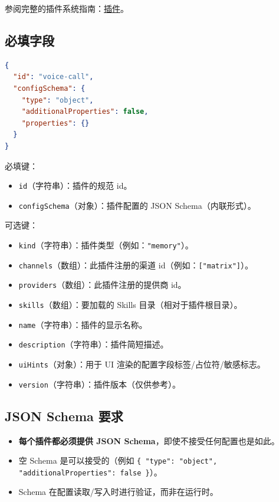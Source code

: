 参阅完整的插件系统指南：\href{/tools/plugin}{插件}。

\subsection{必填字段}


\begin{lstlisting}[language=json]
{
  "id": "voice-call",
  "configSchema": {
    "type": "object",
    "additionalProperties": false,
    "properties": {}
  }
}
\end{lstlisting}


必填键：

\begin{itemize}
  \item \texttt{id}（字符串）：插件的规范 id。
  \item \texttt{configSchema}（对象）：插件配置的 JSON Schema（内联形式）。
\end{itemize}


可选键：

\begin{itemize}
  \item \texttt{kind}（字符串）：插件类型（例如：\texttt{"memory"}）。
  \item \texttt{channels}（数组）：此插件注册的渠道 id（例如：\texttt{["matrix"]}）。
  \item \texttt{providers}（数组）：此插件注册的提供商 id。
  \item \texttt{skills}（数组）：要加载的 Skills 目录（相对于插件根目录）。
  \item \texttt{name}（字符串）：插件的显示名称。
  \item \texttt{description}（字符串）：插件简短描述。
  \item \texttt{uiHints}（对象）：用于 UI 渲染的配置字段标签/占位符/敏感标志。
  \item \texttt{version}（字符串）：插件版本（仅供参考）。
\end{itemize}


\subsection{JSON Schema 要求}


\begin{itemize}
  \item \textbf{每个插件都必须提供 JSON Schema}，即使不接受任何配置也是如此。
  \item 空 Schema 是可以接受的（例如 \texttt{\{ "type": "object", "additionalProperties": false \}}）。
  \item Schema 在配置读取/写入时进行验证，而非在运行时。
\end{itemize}


